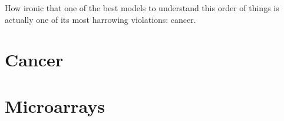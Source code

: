 \documentclass{tufte-book}
\begin{document}
How ironic that one of the best models to understand this order of things is
actually one of its most harrowing violations: cancer.\bigskip

\section{Cancer}

\bigskip

\section{Microarrays}

\backmatter



% 
% 
\end{document}

